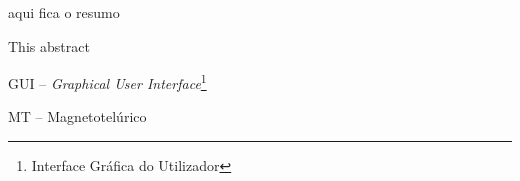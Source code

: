 \documentclass[12pt,twoside,oneright,a4paper,chapter=TITLE,english,brazil]{unipampa}
\newcommand{\en}[1]{\textit{#1}}
\begin{document}
\imprimircapa                   %

\imprimirfolhaderosto*          %

\imprimirfichacatalografica     %

\imprimirfolhadeaprovacao       %




    




\begin{resumo}
 aqui fica o resumo
\end{resumo}


\begin{resumoingles}
 This abstract
\end{resumoingles}


\listoffigures      %


\begin{siglas}
    \item[GUI --]              \en{Graphical User Interface}\footnote{Interface Gráfica do Utilizador}
    \item[MT --]               Magnetotelúrico
\end{siglas}
\end{document}
